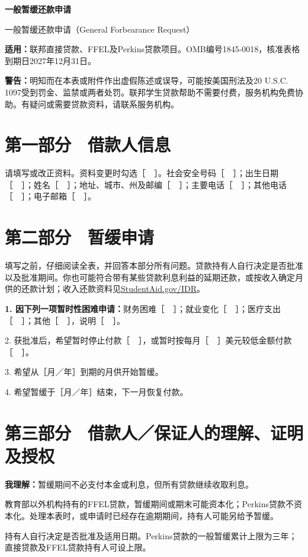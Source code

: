 \documentclass[UTF8,fontset=none,11pt,a4paper]{ctexart}
\begin{document}
{\noindent\fontsize{20}{25}\selectfont\bfseries 一般暂缓还款申请\par}
\vspace{10pt}
一般暂缓还款申请（General Forbearance Request）


\textbf{适用：}联邦直接贷款、FFEL及Perkins贷款项目。OMB编号1845-0018，核准表格到期日2027年12月31日。


\textbf{警告：}明知而在本表或附件作出虚假陈述或误导，可能按美国刑法及20 U.S.C. 1097受到罚金、监禁或两者处罚。联邦学生贷款帮助不需要付费，服务机构免费协助。有疑问或需要贷款资料，请联系服务机构。


\section*{第一部分　借款人信息}
请填写或改正资料。资料变更时勾选［　］。社会安全号码［　］；出生日期［　］；姓名［　］；地址、城市、州及邮编［　］；主要电话［　］；其他电话［　］；电子邮箱［　］。


\section*{第二部分　暂缓申请}
填写之前，仔细阅读全表，并回答本部分所有问题。贷款持有人自行决定是否批准以及批准期间。你也可能符合带有某些贷款利息利益的延期还款，或按收入确定月供的还款计划；收入还款资料见\url{StudentAid.gov/IDR}。


\textbf{1. 因下列一项暂时性困难申请：}财务困难［　］；就业变化［　］；医疗支出［　］；其他［　］，说明［　］。


2. 获批准后，希望暂时停止付款［　］，或暂时按每月［　］美元较低金额付款［　］。


3. 希望从［月／年］到期的月供开始暂缓。


4. 希望暂缓于［月／年］结束，下一月恢复付款。


\section*{第三部分　借款人／保证人的理解、证明及授权}
\textbf{我理解：}暂缓期间不必支付本金或利息，但所有贷款继续收取利息。


教育部以外机构持有的FFEL贷款，暂缓期间或期末可能资本化；Perkins贷款不资本化。处理本表时，或申请时已经存在逾期期间，持有人可能另给予暂缓。


持有人自行决定是否批准及适用日期。Perkins贷款的一般暂缓累计上限为三年；直接贷款及FFEL贷款持有人可设上限。
\end{document}
